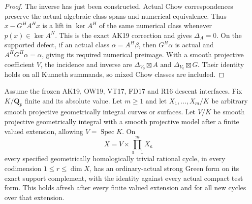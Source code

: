 \begin{proof}
The inverse has just been constructed. Actual Chow
correspondences preserve the actual algebraic class spans
and numerical equivalence. Thus $x-G^HA^Hx$ is a lift in
$\ker A^H$ of the same numerical class whenever
$p(x)\in\ker A^N$. This is the exact AK19 correction and
gives $\Delta_A=0$. On the supported defect, if an actual
class $\alpha=A^H\beta$, then $G^H\alpha$ is actual and
$A^HG^H\alpha=\alpha$, giving its required numerical
preimage. With a smooth projective coefficient $V$, the
incidence and inverse are $\Delta_{V_0}\boxtimes A$ and
$\Delta_{V_0}\boxtimes G$. Their identity holds on all
Kunneth summands, so mixed Chow classes are included.
\end{proof}

\begin{theorem}
\label{r20dp:green}
Assume the frozen AK19, OW19, VT17, FD17 and R16 descent
interfaces. Fix $K/\mathbf Q_p$ finite and its absolute value.
Let $m\geq1$ and let $X_1,\ldots,X_m/K$ be arbitrary smooth projective
geometrically integral curves or surfaces. Let $V/K$ be
smooth projective geometrically integral with a smooth
projective model after a finite valued extension, allowing
$V=\operatorname{Spec}K$. On
\[
                      X=V\times\prod_{a=1}^mX_a
 \tag{DP20.17}
\]
every specified geometrically homologically trivial rational
cycle, in every codimension $1\le r\le\dim X$, has an
ordinary-actual strong Green form on its exact support
complement, with the identity against every actual compact
test form. This holds afresh after every finite valued
extension and for all new cycles over that extension.
\end{theorem}

